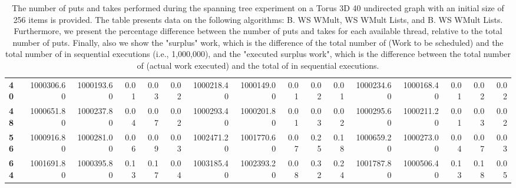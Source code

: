 \begin{table}[!ht]
{\begin{tabular}{lrrrrrrrrrrrrrrr}
\textbf{40} &  1000306.60 & 1000193.60 &           0.01 &        0.03 &                 0.02 &     1000218.40 & 1000149.00 &           0.01 &        0.02 &                 0.01 &        1000234.60 & 1000168.40 &           0.01 &        0.02 &                 0.02 \\
\textbf{48} &  1000651.80 & 1000237.80 &           0.04 &        0.07 &                 0.02 &     1000293.40 & 1000201.80 &           0.01 &        0.03 &                 0.02 &        1000295.60 & 1000211.20 &           0.01 &        0.03 &                 0.02 \\
\textbf{56} &  1000916.80 & 1000281.00 &           0.06 &        0.09 &                 0.03 &     1002471.20 & 1001770.60 &           0.07 &        0.25 &                 0.18 &        1000659.20 & 1000273.00 &           0.04 &        0.07 &                 0.03 \\
\textbf{64} &  1001691.80 & 1000395.80 &           0.13 &        0.17 &                 0.04 &     1003185.40 & 1002393.20 &           0.08 &        0.32 &                 0.24 &        1001787.80 & 1000506.40 &           0.13 &        0.18 &                 0.05 \\
\bottomrule
\end{tabular}}
\label{difference-Torus_3D_40_undirected-256-B_WS_NC_MULT_OPT-WS_NC_MULT_LA_OPT-B_WS_NC_MULT_LA_OPT}
\caption{The number of puts and takes performed during the
    spanning tree experiment on a Torus 3D 40 undirected graph with an initial size
    of 256 items is provided. The table presents data on the
    following algorithms: B. WS WMult, WS WMult Lists, and
    B. WS WMult Lists. Furthermore, we present the percentage difference
    between the number of puts and takes for each available thread,
    relative to the total number of puts. Finally, also we show the
    "surplus" work, which is the difference of the total number of
    \Puts (Work to be scheduled) and the total number of \Puts in
    sequential executions (i.e., 1,000,000), and the "executed surplus
    work", which is the difference between the total number of \Takes
    (actual work executed) and the total of \Takes in sequential
    executions.}
\end{table}
